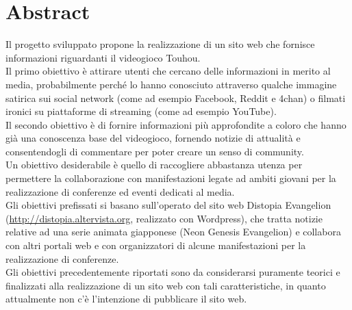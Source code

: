 \documentclass[openany, a4paper, 12pt]{report}
\begin{document}


	\chapter{Abstract}
	Il progetto sviluppato propone la realizzazione di un sito web che fornisce informazioni riguardanti il videogioco Touhou.\\
	Il primo obiettivo è attirare utenti che cercano delle informazioni in merito al media, probabilmente perché lo hanno conosciuto attraverso qualche immagine satirica sui social network (come ad esempio Facebook, Reddit e 4chan) o filmati ironici su piattaforme di streaming (come ad esempio YouTube).\\
	Il secondo obiettivo è di fornire informazioni più approfondite a coloro che hanno già una conoscenza base del videogioco, fornendo notizie di attualità e consentendogli di commentare per poter creare un senso di community.\\
	Un obiettivo desiderabile è quello di raccogliere abbastanza utenza per permettere la collaborazione con manifestazioni legate ad ambiti giovani per la realizzazione di conferenze ed eventi dedicati al media.\\
	Gli obiettivi prefissati si basano sull'operato del sito web Distopia Evangelion (\url{http://distopia.altervista.org}, realizzato con Wordpress), che tratta notizie relative ad una serie animata giapponese (Neon Genesis Evangelion) e collabora con altri portali web e con organizzatori di alcune manifestazioni per la realizzazione di conferenze.\\
	Gli obiettivi precedentemente riportati sono da considerarsi puramente teorici e finalizzati alla realizzazione di un sito web con tali caratteristiche, in quanto attualmente non c'è l'intenzione di pubblicare il sito web.
\end{document}
